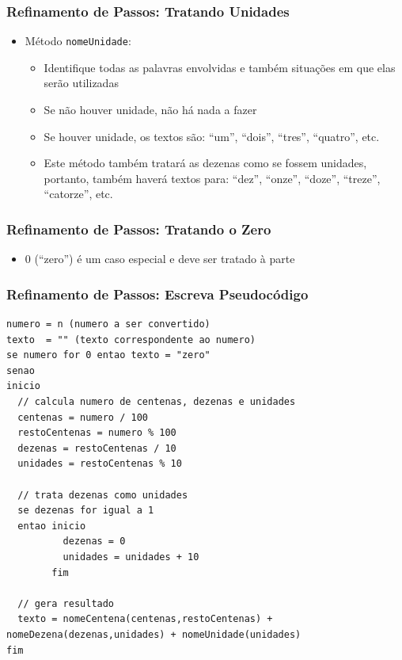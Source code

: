 \documentclass[xcolor={dvipsnames,table},aspectratio=169]{beamer}
\begin{document}
\begin{frame}\frametitle{Refinamento de Passos: Tratando Unidades}
\begin{itemize}
	\item Método \texttt{nomeUnidade}:
	\begin{itemize}
		\item Identifique todas as palavras envolvidas e também situações em que elas serão utilizadas
		\item Se não houver unidade, não há nada a fazer
		\item Se houver unidade, os textos são: ``um'', ``dois'', ``tres'', ``quatro'', etc.
		\item Este método também tratará as dezenas como se fossem unidades, portanto, também haverá textos para: ``dez'', ``onze'', ``doze'', ``treze'', ``catorze'', etc.
	\end{itemize}
\end{itemize}
\end{frame}

\begin{frame}\frametitle{Refinamento de Passos: Tratando o Zero}
\begin{itemize}
	\item 0 (``zero'') é um caso especial e deve ser tratado à parte
\end{itemize}
\end{frame}

\begin{frame}[fragile]\frametitle{Refinamento de Passos: Escreva Pseudocódigo}
{\tiny
\begin{verbatim}
numero = n (numero a ser convertido)
texto  = "" (texto correspondente ao numero)
se numero for 0 entao texto = "zero"
senao
inicio
  // calcula numero de centenas, dezenas e unidades
  centenas = numero / 100
  restoCentenas = numero % 100
  dezenas = restoCentenas / 10
  unidades = restoCentenas % 10

  // trata dezenas como unidades
  se dezenas for igual a 1
  entao inicio
          dezenas = 0
          unidades = unidades + 10
        fim

  // gera resultado
  texto = nomeCentena(centenas,restoCentenas) + nomeDezena(dezenas,unidades) + nomeUnidade(unidades)
fim
\end{verbatim}
}
\end{frame}
\end{document}
